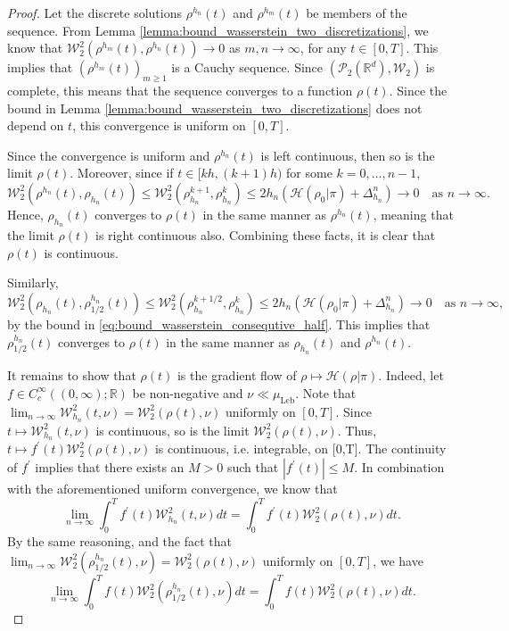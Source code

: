 \documentclass[final,12pt]{colt2018}
\newcommand{\was}{\mathcal{W}}
\begin{document}
\begin{proof}
Let the discrete solutions $\rho^{h_n}(t)$ and $\rho^{h_m}(t)$ be members of the sequence. From Lemma \ref{lemma:bound_wasserstein_two_discretizations}, we know that $\was^2_2(\rho^{h_m}(t), \rho^{h_n}(t)) \to 0$ as $m, n \to \infty$, for any $t\in[0,T]$. This implies that $(\rho^{h_m}(t))_{m\geq1}$ is a Cauchy sequence. Since $(\mathcal{P}_2(\mathbb{R}^d), \was_2)$ is complete, this means that the sequence converges to a function $\rho(t)$. Since the bound in Lemma \ref{lemma:bound_wasserstein_two_discretizations} does not depend on $t$, this convergence is uniform on $[0,T]$.

Since the convergence is uniform and $\rho^{h_n}(t)$ is left continuous, then so is the limit $\rho(t)$. Moreover, since if $t\in[kh,(k+1)h)$ for some $k = 0,\dots,n-1$, 
\begin{equation}
\was_2^2(\rho^{h_n}(t),\rho_{h_n}(t)) \leq \was_2^2(\rho_{h_n}^{k+1},\rho_{h_n}^{k}) \leq 2h_n\left(\mathcal{H}(\rho_{0}| \pi)  + \Delta_{h_n}^{n}\right) \to 0 \quad \text{as $n \to \infty$}.
\end{equation}
 Hence, $\rho_{h_n}(t)$ converges to $\rho(t)$ in the same manner as $\rho^{h_n}(t)$, meaning that the limit $\rho(t)$ is right continuous also. Combining these facts, it is clear that $\rho(t)$ is continuous. 

Similarly,
\begin{equation}
\was_2^2(\rho_{h_n}(t),\rho^{h_n}_{1/2}(t)) \leq \was_2^2(\rho_{h_n}^{k+1/2},\rho_{h_n}^{k}) \leq 2h_n\left(\mathcal{H}(\rho_{0}| \pi)  + \Delta_{h_n}^{n}\right) \to 0 \quad \text{as $n \to \infty$},
\end{equation}
by the bound in \eqref{eq:bound_wasserstein_consequtive_half}. This implies that $\rho^{h_n}_{1/2}(t)$ converges to $\rho(t)$ in the same manner as $\rho_{h_n}(t)$ and $\rho^{h_n}(t)$.

It remains to show that $\rho(t)$ is the gradient flow of $\rho\mapsto \mathcal{H}(\rho|\pi)$. Indeed, let $f \in C_c^\infty((0,\infty); \mathbb{R})$ be non-negative and $\nu \ll \mu_{\text{Leb}}$. Note that $\lim_{n \to \infty} \was_{h_n}^2(t,\nu) = \was_2^2(\rho(t),\nu)$ uniformly on $[0,T]$. Since $t \mapsto \was_{h_n}^2(t,\nu)$ is continuous, so is the limit $\was_2^2(\rho(t),\nu)$. Thus, $t \mapsto f^\prime(t) \was_2^2(\rho(t),\nu)$ is continuous, i.e. integrable, on [0,T]. The continuity of $f^\prime$ implies that there exists an $M>0$ such that $|f^\prime(t)| \leq M$. In combination with the aforementioned uniform convergence, we know that 
\begin{equation}
\lim_{n \to \infty} \int_0^T f^\prime(t) \was_{h_n}^2(t,\nu)dt = \int_0^T f^\prime(t) \was_2^2(\rho(t),\nu)dt.
\end{equation}
By the same reasoning, and the fact that $\lim_{n \to \infty} \was^2_2(\rho_{1/2}^{h_n}(t),\nu) = \was_2^2(\rho(t),\nu)$ uniformly on $[0,T]$, we have
\begin{equation}
\lim_{n \to \infty} \int_0^T f(t) \was^2_2(\rho_{1/2}^{h_n}(t),\nu)dt = \int_0^T f(t) \was_2^2(\rho(t),\nu)dt.
\end{equation}


\end{proof}
\end{document}
